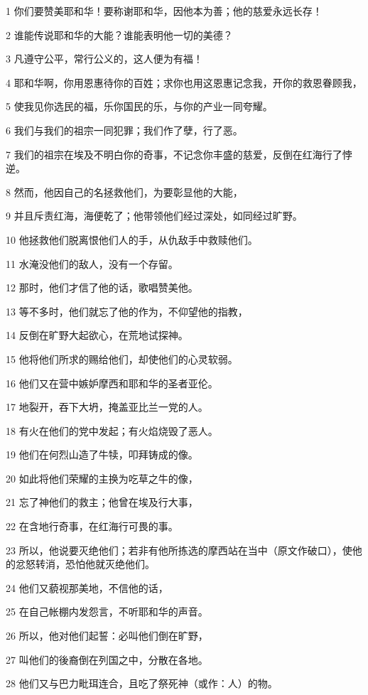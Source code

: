 \par 1 你们要赞美耶和华！要称谢耶和华，因他本为善；他的慈爱永远长存！
\par 2 谁能传说耶和华的大能？谁能表明他一切的美德？
\par 3 凡遵守公平，常行公义的，这人便为有福！
\par 4 耶和华啊，你用恩惠待你的百姓；求你也用这恩惠记念我，开你的救恩眷顾我，
\par 5 使我见你选民的福，乐你国民的乐，与你的产业一同夸耀。
\par 6 我们与我们的祖宗一同犯罪；我们作了孽，行了恶。
\par 7 我们的祖宗在埃及不明白你的奇事，不记念你丰盛的慈爱，反倒在红海行了悖逆。
\par 8 然而，他因自己的名拯救他们，为要彰显他的大能，
\par 9 并且斥责红海，海便乾了；他带领他们经过深处，如同经过旷野。
\par 10 他拯救他们脱离恨他们人的手，从仇敌手中救赎他们。
\par 11 水淹没他们的敌人，没有一个存留。
\par 12 那时，他们才信了他的话，歌唱赞美他。
\par 13 等不多时，他们就忘了他的作为，不仰望他的指教，
\par 14 反倒在旷野大起欲心，在荒地试探神。
\par 15 他将他们所求的赐给他们，却使他们的心灵软弱。
\par 16 他们又在营中嫉妒摩西和耶和华的圣者亚伦。
\par 17 地裂开，吞下大坍，掩盖亚比兰一党的人。
\par 18 有火在他们的党中发起；有火焰烧毁了恶人。
\par 19 他们在何烈山造了牛犊，叩拜铸成的像。
\par 20 如此将他们荣耀的主换为吃草之牛的像，
\par 21 忘了神他们的救主；他曾在埃及行大事，
\par 22 在含地行奇事，在红海行可畏的事。
\par 23 所以，他说要灭绝他们；若非有他所拣选的摩西站在当中（原文作破口），使他的忿怒转消，恐怕他就灭绝他们。
\par 24 他们又藐视那美地，不信他的话，
\par 25 在自己帐棚内发怨言，不听耶和华的声音。
\par 26 所以，他对他们起誓：必叫他们倒在旷野，
\par 27 叫他们的後裔倒在列国之中，分散在各地。
\par 28 他们又与巴力毗珥连合，且吃了祭死神（或作：人）的物。
